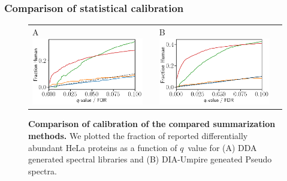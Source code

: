 \documentclass[11pt]{article}
\begin{document}
\subsubsection*{Comparison of statistical calibration}
\begin{figure}[hbt]
    \centering
    \centering
    \begin{tabular}{lclc} 
        A \includegraphics[width=0.5\linewidth]{../../result/report_plots/osw_FP_DE_all.png} & &%
        B \includegraphics[width=0.5\linewidth]{../../result/report_plots/diann_FP_DE_all.png} & \\%
    \end{tabular}
  \caption{{\bf Comparison of calibration of the compared summarization methods.} We plotted the fraction of reported differentially abundant HeLa proteins as a function of $q$~value for (A) DDA generated spectral libraries and (B) DIA-Umpire geneated Pseudo spectra. \label{fig:frac_hela_vs_fdr_find_a_better_label}}
\end{figure}
\fi
\end{document}
